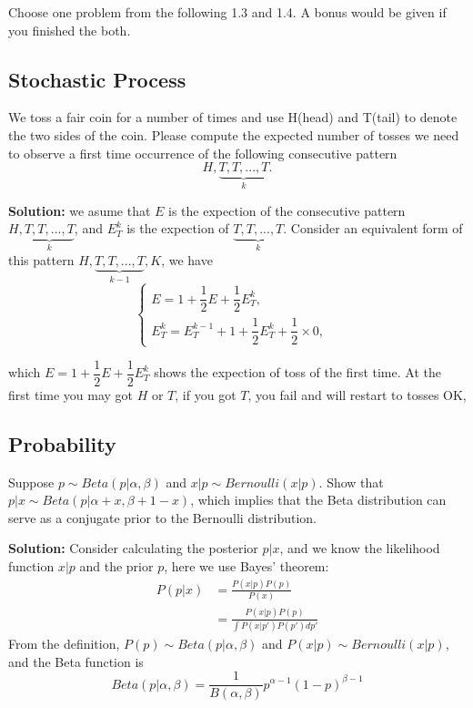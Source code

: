 \documentclass[a4paper]{article}
\begin{document}
Choose one problem from the following 1.3 and 1.4. A bonus would be given if
you finished the both.

\subsection{Stochastic Process}
We toss a fair coin for a number of times and use H(head) and T(tail) to denote the two sides of the coin. Please compute the expected number of tosses we need to observe a first time occurrence of the following consecutive pattern
\begin{equation}
    H,\underbrace{T,T,...,T}_{k}.
\end{equation}

\textbf{Solution:} we asume that $E$ is the expection of the consecutive pattern $H,\underbrace{T,T,...,T}_{k}$, and $E_{T}^{k}$ is the   expection of $\underbrace{T,T,...,T}_{k}$. Consider an equivalent form of this pattern $H,\underbrace{T,T,...,T}_{k-1},K$, we have 
\begin{equation}  
\left\{  
             \begin{array}{lr}  
             E = 1 + \dfrac{1}{2}E +  \dfrac{1}{2}E_{T}^{k}, &  \\  
             E_{T}^{k} = E_{T}^{k-1} + 1 + \dfrac{1}{2}E_{T}^{k} + \dfrac{1}{2} \times 0, &    
             \end{array}  
\right.  
\end{equation}  

which $E = 1 + \dfrac{1}{2}E +  \dfrac{1}{2}E_{T}^{k}$ shows the expection of toss of the first time. At the first time you may got $H$ or $T$, if you got $T$, you fail and will restart to tosses OK, 



\subsection{Probability}

Suppose $p \sim Beta(p|\alpha, \beta)$ and $x|p \sim Bernoulli(x|p)$. Show that $p|x \sim Beta(p|\alpha + x, \beta + 1 - x)$, which implies that the Beta distribution can serve as a conjugate prior to the Bernoulli distribution.

\textbf{Solution:} Consider calculating the posterior $p|x$, and we know the likelihood function $x|p$ and the prior $p$, here we use Bayes' theorem:
\begin{equation}
    \begin{aligned}
        P(p | x) &= \frac{P(x|p) P(p)}{P(x)} \\
                 &= \frac{P(x|p) P(p)}{\int P(x|p') P(p') dp'} 
    \end{aligned}
\end{equation}
From the definition, $P(p) \sim Beta(p|\alpha, \beta)$ and $P(x|p) \sim Bernoulli(x|p)$, and the Beta function is 
\begin{equation}
    Beta(p|\alpha, \beta) = \frac{1}{B(\alpha, \beta)} p^{\alpha - 1} (1-p)^{\beta-1}
\end{equation}
\end{document}
